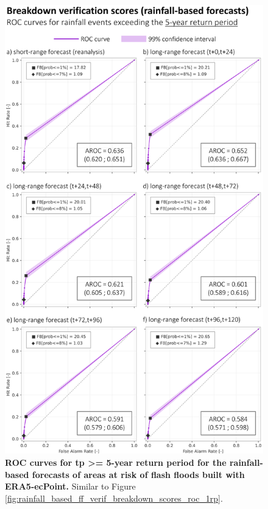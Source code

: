 \begin{figure}[htbp]
\centering
\includegraphics[width=\textwidth]{chapter_05/figures/rainfall_based_ff_verif_breakdown_scores_roc_5rp.png}
\caption{\textbf{ROC curves for tp >= 5-year return period for the rainfall-based forecasts of areas at risk of flash floods built with ERA5-ecPoint.} Similar to Figure \ref{fig:rainfall_based_ff_verif_breakdown_scores_roc_1rp}.}
\label{fig:rainfall_based_ff_verif_breakdown_scores_roc_5rp}
\end{figure}

